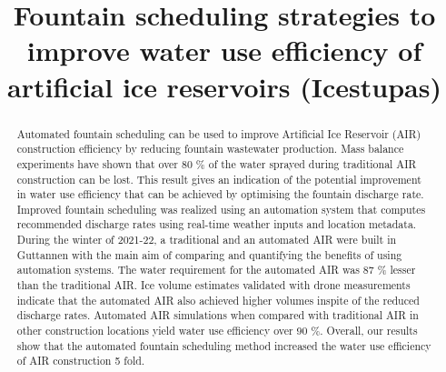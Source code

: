 \documentclass[tc, manuscript]{copernicus}
\begin{document}
\title{Fountain scheduling strategies to improve water use efficiency of artificial
ice reservoirs (Icestupas)}

\def\Authors{Suryanarayanan Balasubramanian\,$^{1}$, Roger Waser\,$^{2}$, Martin Hoelzle\,$^{1}$}
\def\Address{$^{1}$University of Fribourg, Department of Geosciences, Fribourg, Switzerland $^{2}$University of
Applied Sciences and Arts, Luzern, Switzerland} \def\corrAuthor{Suryanarayanan Balasubramanian}





\maketitle

\begin{abstract}

  Automated fountain scheduling can be used to improve Artificial Ice Reservoir (AIR) construction efficiency by
  reducing fountain wastewater production. Mass balance experiments have shown that over 80 \% of the water
  sprayed during traditional AIR construction can be lost. This result gives an indication of the potential
  improvement in water use efficiency that can be achieved by optimising the fountain discharge rate. Improved
  fountain scheduling was realized using an automation system that computes recommended discharge rates using
  real-time weather inputs and location metadata. During the winter of 2021-22, a traditional and an automated
  AIR were built in Guttannen with the main aim of comparing and quantifying the benefits of using automation
  systems. The water requirement for the automated AIR was 87 \% lesser than the traditional AIR. Ice volume
  estimates validated with drone measurements indicate that the automated AIR also achieved higher volumes
  inspite of the reduced discharge rates. Automated AIR simulations when compared with traditional AIR in other
  construction locations yield water use efficiency over 90 \%. Overall, our results show that the automated
  fountain scheduling method increased the water use efficiency of AIR construction 5 fold.

\end{abstract}
\end{document}
